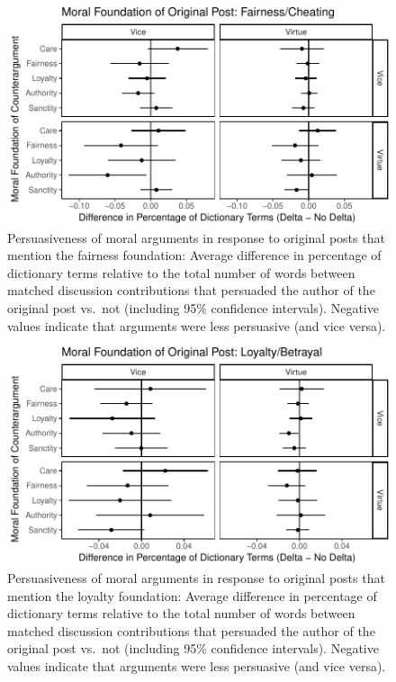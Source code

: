 \documentclass[12pt,]{article}
\begin{document}
\begin{figure}
\centering
\includegraphics{prelim_files/figure-latex/op fairness-1.pdf}
\caption{Persuasiveness of moral arguments in response to original posts
that mention the fairness foundation: Average difference in percentage
of dictionary terms relative to the total number of words between
matched discussion contributions that persuaded the author of the
original post vs.~not (including 95\% confidence intervals). Negative
values indicate that arguments were less persuasive (and vice versa).}
\end{figure}

\begin{figure}
\centering
\includegraphics{prelim_files/figure-latex/op ingroup-1.pdf}
\caption{Persuasiveness of moral arguments in response to original posts
that mention the loyalty foundation: Average difference in percentage of
dictionary terms relative to the total number of words between matched
discussion contributions that persuaded the author of the original post
vs.~not (including 95\% confidence intervals). Negative values indicate
that arguments were less persuasive (and vice versa).}
\end{figure}
\end{document}
